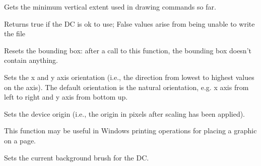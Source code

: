 
Gets the minimum vertical extent used in drawing commands so far.

\label{wxdcok}


Returns true if the DC is ok to use; False values arise from being unable to 
write the file

\label{wxdcresetboundingbox}


Resets the bounding box: after a call to this function, the bounding box
doesn't contain anything.



\label{wxdcsetaxisorientation}


Sets the x and y axis orientation (i.e., the direction from lowest to
highest values on the axis). The default orientation is the natural
orientation, e.g. x axis from left to right and y axis from bottom up.




\label{wxdcsetdeviceorigin}


Sets the device origin (i.e., the origin in pixels after scaling has been
applied).

This function may be useful in Windows printing
operations for placing a graphic on a page.

\label{wxdcsetbackground}


Sets the current background brush for the DC.

